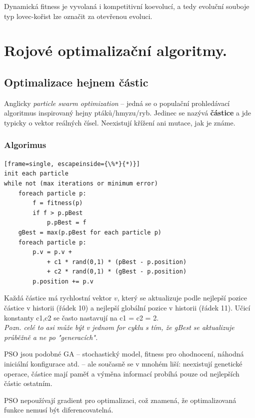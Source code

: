 Dynamická fitness je vyvolaná i kompetitivní koevolucí, a tedy evoluční souboje typ lovec-kořist lze označit za otevřenou evoluci.




\section{Rojové optimalizační algoritmy.}
\subsection{Optimalizace hejnem částic}
Anglicky \textit{particle swarm optimization} -- jedná se o populační prohledávací algoritmus inspirovaný hejny ptáků/hmyzu/ryb. Jedinec se nazývá \textbf{částice} a jde typicky o vektor reálných čísel. Neexistují křížení ani mutace, jak je známe.

\subsubsection{Algorimus}
\begin{minipage}{\linewidth}
	\begin{lstlisting}[frame=single, escapeinside={\%*}{*)}]
init each particle
while not (max iterations or minimum error)
	foreach particle p:
		f = fitness(p)
		if f > p.pBest
			p.pBest = f
	gBest = max(p.pBest for each particle p)			
	foreach particle p:
		p.v = p.v + 
			+ c1 * rand(0,1) * (pBest - p.position) 
			+ c2 * rand(0,1) * (gBest - p.position) 
		p.position += p.v		
	\end{lstlisting}
\end{minipage}

Každá částice má rychlostní vektor $v$, který se aktualizuje podle nejlepší pozice částice v historii (řádek 10) a nejlepší globální pozice v historii (řádek 11). Učicí konstanty c1,c2 se často nastavují na c1 = c2 = 2. \\
\textit{Pozn. celé to asi může být v jednom for cyklu s tím, že gBest se aktualizuje průběžně a ne po "generacích".}

PSO jsou podobné GA -- stochastický model, fitness pro ohodnocení, náhodná iniciální konfigurace atd. -- ale současně se v mnohém liší: neexistují genetické operace, částice mají paměť a výměna informací probíhá pouze od nejlepších částic ostatním. 

PSO nepoužívají gradient pro optimalizaci, což znamená, že optimalizovaná funkce nemusí být diferencovatelná.


